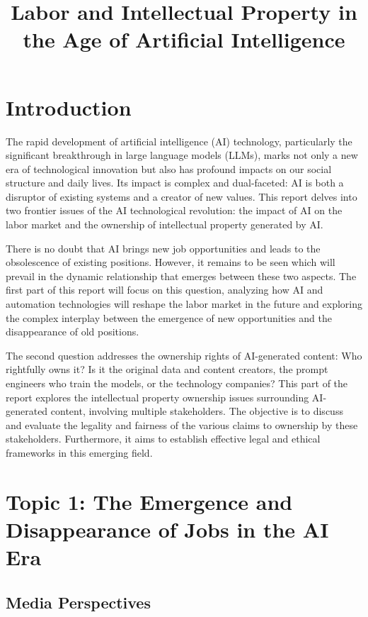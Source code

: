 \documentclass[11pt]{article}
\title{Labor and Intellectual Property in the Age of Artificial Intelligence}
\begin{document}
\maketitle

\section{Introduction}

The rapid development of artificial intelligence (AI) technology, particularly the significant breakthrough in large language models (LLMs), marks not only a new era of technological innovation but also has profound impacts on our social structure and daily lives. Its impact is complex and dual-faceted: AI is both a disruptor of existing systems and a creator of new values. This report delves into two frontier issues of the AI technological revolution: the impact of AI on the labor market and the ownership of intellectual property generated by AI.

There is no doubt that AI brings new job opportunities and leads to the obsolescence of existing positions. However, it remains to be seen which will prevail in the dynamic relationship that emerges between these two aspects. The first part of this report will focus on this question, analyzing how AI and automation technologies will reshape the labor market in the future and exploring the complex interplay between the emergence of new opportunities and the disappearance of old positions.

The second question addresses the ownership rights of AI-generated content: Who rightfully owns it? Is it the original data and content creators, the prompt engineers who train the models, or the technology companies? This part of the report explores the intellectual property ownership issues surrounding AI-generated content, involving multiple stakeholders. The objective is to discuss and evaluate the legality and fairness of the various claims to ownership by these stakeholders. Furthermore, it aims to establish effective legal and ethical frameworks in this emerging field.

\section{Topic 1: The Emergence and Disappearance of Jobs in the AI Era}

\subsection{Media Perspectives}
\end{document}
